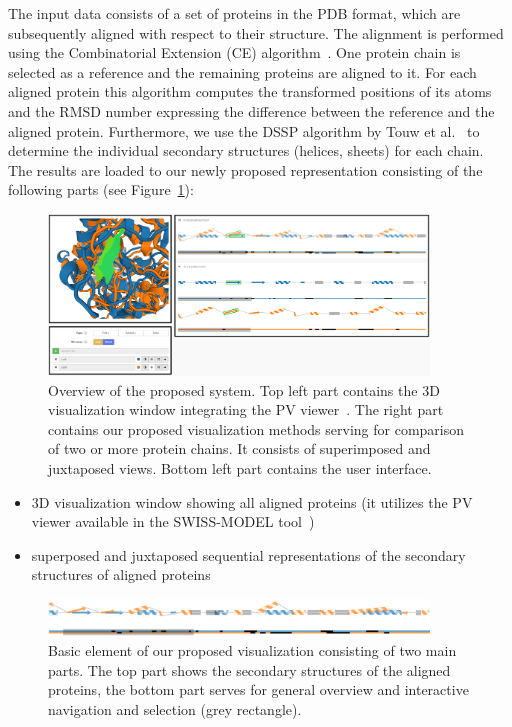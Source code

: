 \documentclass[twocolumn]{bmcart}%
\begin{document}
The input data consists of a set of proteins in the PDB format, which are subsequently aligned with respect to their structure.
The alignment is performed using the Combinatorial Extension (CE) algorithm~\cite{Shindyalov1998}. 
One protein chain is selected as a reference and the remaining proteins are aligned to it.
For each aligned protein this algorithm computes the transformed positions of its atoms and the RMSD number expressing the difference between the reference and the aligned protein.  
Furthermore, we use the DSSP algorithm by Touw et al.~\cite{dssp} to determine the individual secondary structures (helices, sheets) for each chain.
The results are loaded to our newly proposed representation consisting of the following parts (see Figure~\ref{fig:design}):

\begin{figure}[t]
  \centering
  \includegraphics[width=0.9\textwidth]{pics/flattening_design2.png}
  \caption{Overview of the proposed system. Top left part contains the 3D visualization window integrating the PV viewer~\cite{biasini2014}. The right part contains our proposed visualization methods serving for comparison of two or more protein chains. It consists of superimposed and juxtaposed views. Bottom left part contains the user interface.}
  \label{fig:design}
\end{figure}

\begin{itemize}
\item 3D visualization window showing all aligned proteins (it utilizes the PV viewer available in the SWISS-MODEL tool~\cite{biasini2014})
\item superposed and juxtaposed sequential representations of the secondary structures of aligned proteins
\end{itemize}

\begin{figure}[t!]
  \centering
  \includegraphics[width=0.9\textwidth]{pics/element2.png}
  \caption{Basic element of our proposed visualization consisting of two main parts. The top part shows the secondary structures of the aligned proteins, the bottom part serves for general overview and interactive navigation and selection (grey rectangle).}
  \label{fig:element}
\end{figure}
\end{document}
